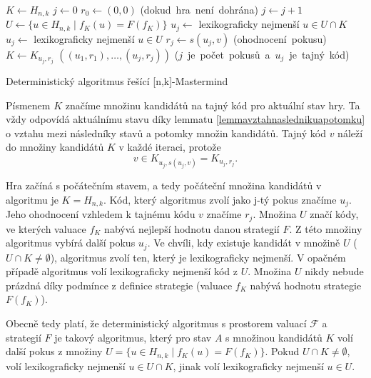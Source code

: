 
\begin{algorithm}[h!]
\begin{algorithmic}[1]  %
    \State $K \gets H_{n,k}$ 
    \State $j \gets 0$
    \State $r_0 \gets (0,0)$
     \hfill \mbox{(dokud hra není dohrána)}
        \State $j \gets j + 1$ 
	\State $U \gets \{u \in H_{n,k} \mid f_K(u) = F(f_K)\}$
            \State $u_j \gets$ lexikograficky nejmenší $u \in U \cap K$
	\Else
		\State $u_j \gets$ lexikograficky nejmenší $u \in U$
	\EndIf
        \State $r_j \gets s(u_j, v)$ \hfill \mbox{(ohodnocení pokusu)}
        \State $K \gets K_{u_j,r_j}$
    \EndWhile
    \State \Return $((u_1,r_1),\dots,(u_j, r_j))$ \hfill \mbox{($j$ je počet pokusů a $u_j$ je tajný kód)}
\EndFunction
\end{algorithmic}
\caption{Deterministický algoritmus řešící [n,k]-Mastermind}
\label{alg-default}
\end{algorithm}

Písmenem $K$ značíme množinu kandidátů na tajný kód pro aktuální stav hry. Ta vždy odpovídá aktuálnímu stavu díky lemmatu \ref{lemmavztahnaslednikuapotomku} o vztahu mezi následníky stavů a potomky množin kandidátů. Tajný kód $v$ náleží do množiny kandidátů $K$ v každé iteraci, protože 
\[v \in K_{u_j, s(u_j,v)} = K_{u_j, r_j}.\]

Hra začíná s počátečním stavem, a tedy počáteční množina kandidátů v algoritmu je $K = H_{n,k}$. Kód, který algoritmus zvolí jako j-tý pokus značíme $u_j$. Jeho ohodnocení vzhledem k tajnému kódu $v$ značíme $r_j$. Množina $U$ značí kódy, ve kterých valuace $f_K$ nabývá nejlepší hodnotu danou strategií $F$. Z této množiny algoritmus vybírá další pokus $u_j$. Ve chvíli, kdy existuje kandidát v množině $U$ ($U\cap K \neq \emptyset$), algoritmus zvolí ten, který je lexikograficky nejmenší. V opačném případě algoritmus volí lexikograficky nejmenší kód z $U$. Množina $U$ nikdy nebude prázdná díky podmínce z definice strategie (valuace $f_K$ nabývá hodnotu strategie $F(f_K)$). 

Obecně tedy platí, že deterministický algoritmus s prostorem valuací $\mathcal{F}$ a strategií $F$ je takový algoritmus, který pro stav $A$ s množinou kandidátů $K$ volí další pokus z množiny $U = \{u \in H_{n,k} \mid f_K(u) = F(f_K)\}$. Pokud $U \cap K \neq \emptyset$, volí lexikograficky nejmenší $u \in U \cap K$, jinak volí lexikograficky nejmenší $u \in U$. 


